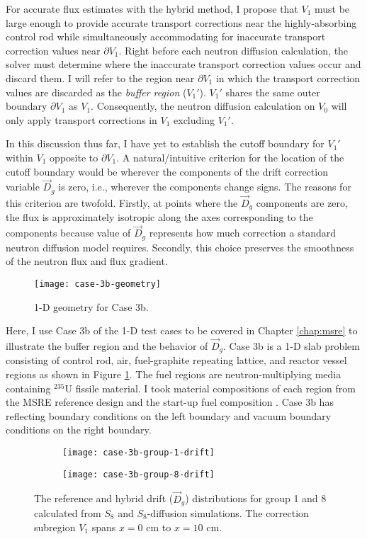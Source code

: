 For accurate flux estimates with the hybrid method, I propose that $V_1$ must be large enough to
provide accurate transport corrections near the highly-absorbing control rod while simultaneously
accommodating for inaccurate transport correction values near $\partial V_1$. Right before each
neutron diffusion calculation, the solver must determine where the inaccurate transport correction
values occur and discard them. I will refer to the region near $\partial V_1$ in which the
transport correction values are discarded as the \textit{buffer region} ($V_1'$).
$V_1'$ shares the same outer boundary $\partial V_1$ as $V_1$. Consequently, the neutron
diffusion calculation on $V_0$ will only apply transport corrections in $V_1$ excluding $V_1'$.

In this discussion thus far, I have yet to establish the cutoff boundary for $V_1'$ within $V_1$
opposite to $\partial V_1$. A natural/intuitive criterion for the location of the cutoff boundary
would be wherever the components of the drift correction variable $\vec{D}_g$ is zero, i.e.,
wherever the components change signs. The reasons for this criterion are twofold. Firstly, at
points where the $\vec{D}_g$ components are zero, the flux is approximately isotropic along the
axes corresponding to the components because value of $\vec{D}_g$ represents how much correction a
standard neutron diffusion model requires. Secondly, this choice preserves the smoothness of the
neutron flux and flux gradient.
%
\begin{figure}[htb!]
	\centering
	\texttt{[image: case-3b-geometry]}
	\caption{1-D geometry for Case 3b.}
	\label{fig:3b-geometry}
\end{figure}

Here, I use Case 3b of the 1-D test cases to be covered in Chapter \ref{chap:msre}
to illustrate the buffer region and the behavior of $\vec{D}_g$. Case 3b is a 1-D slab problem
consisting of control rod, air, fuel-graphite repeating lattice, and reactor vessel regions as
shown in Figure \ref{fig:3b-geometry}. The fuel regions are neutron-multiplying media containing
$^\text{235}$U fissile material. I took material compositions of each region from the \gls{MSRE}
reference design and the start-up fuel composition \cite{fratoni_molten_2020}.
Case 3b has reflecting boundary conditions on the left boundary and vacuum boundary conditions on
the right boundary.
%
\begin{figure}[htb!]
    \centering
    \begin{subfigure}[t]{.49\textwidth}
        \centering
        \texttt{[image: case-3b-group-1-drift]}
    \end{subfigure}
    \hfill
    \begin{subfigure}[t]{.49\textwidth}
        \centering
        \texttt{[image: case-3b-group-8-drift]}
    \end{subfigure}
    \caption{The reference and hybrid drift ($\vec{D}_g$) distributions for group 1 and 8 calculated
      from $S_8$ and $S_8$-diffusion simulations. The correction subregion $V_1$ spans $x=0$ cm to
      $x=10$ cm.}
    \label{fig:3b-drift}
\end{figure}

